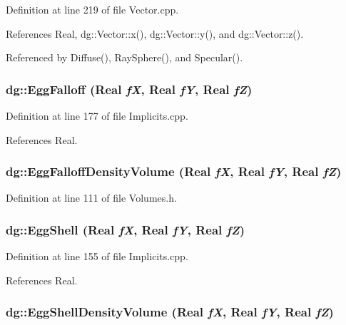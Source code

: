 Definition at line 219 of file Vector.cpp.

References Real, dg::Vector::x(), dg::Vector::y(), and dg::Vector::z().

Referenced by Diffuse(), Ray\-Sphere(), and Specular().
\subsubsection{ dg::Egg\-Falloff ({\bf Real} {\em f\-X}, {\bf Real} {\em f\-Y}, {\bf Real} {\em f\-Z})}\label{namespacedg_a83}




Definition at line 177 of file Implicits.cpp.

References Real.
\subsubsection{ dg::Egg\-Falloff\-Density\-Volume ({\bf Real} {\em f\-X}, {\bf Real} {\em f\-Y}, {\bf Real} {\em f\-Z})\hspace{0.3cm}{\tt  [inline]}}\label{namespacedg_a197}




Definition at line 111 of file Volumes.h.
\subsubsection{ dg::Egg\-Shell ({\bf Real} {\em f\-X}, {\bf Real} {\em f\-Y}, {\bf Real} {\em f\-Z})}\label{namespacedg_a82}




Definition at line 155 of file Implicits.cpp.

References Real.
\subsubsection{ dg::Egg\-Shell\-Density\-Volume ({\bf Real} {\em f\-X}, {\bf Real} {\em f\-Y}, {\bf Real} {\em f\-Z})\hspace{0.3cm}{\tt  [inline]}}\label{namespacedg_a196}




